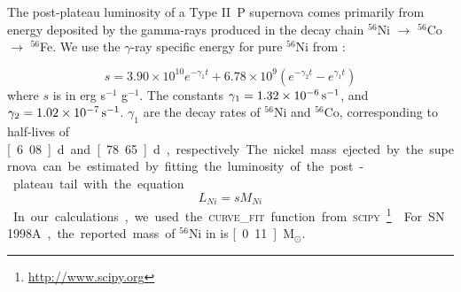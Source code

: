 \documentclass[apj]{emulateapj}
\begin{document}
The post-plateau luminosity of a Type II~P supernova comes primarily from energy deposited by the gamma-rays produced in the decay chain $^{56}$Ni $\rightarrow$ $^{56}$Co $\rightarrow$ $^{56}$Fe.
We use the $\gamma$-ray specific energy for pure $^{56}$Ni from \cite{sutherland_models_1984}:

\begin{equation}
    s = 3.90 \times 10^{10} e^{-\gamma_1 t} + 6.78 \times 10^{9} \left( e^{-\gamma_2 t} - e^{\gamma_1 t} \right)
\end{equation}
where $s$ is in erg s$^{-1}$ g$^{-1}$. The constants $\gamma_1 = \unit [1.32\times10^{-6}]{s^{-1}}$, and $\gamma_2 = \unit[1.02\times10^{-7}]{s^{-1}}$. $\gamma_1$ are the decay rates of $^{56}$Ni and $^{56}$Co, corresponding to half-lives of \unit[6.08]{d} and \unit[78.65]{d}, respectively.

The nickel mass ejected by the supernova can be estimated by fitting the luminosity of the post-plateau tail with the equation

\begin{equation}
    L_{Ni} = sM_{Ni}
\end{equation}
In our calculations, we used the \textsc{curve\_fit} function from \textsc{scipy}\footnote{\url{http://www.scipy.org}} \citep{jones_scipy:_2001}

For SN 1998A, the reported mass of $^{56}$Ni in \cite{pastorello_sn_2005} is \unit[0.11]{M$_{\odot}$}.



\end{document}
